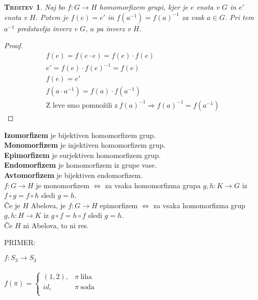 \documentclass[a4paper,12pt]{article}
\newtheorem*{trditev}{\textsc{Trditev}}
\begin{document}
\begin{itemize}
\end{itemize}

\begin{trditev}
Naj bo $f:G\rightarrow H$ homomorfizem grupi, kjer je $e$ enota v $G$ in $e'$ enota v $H$. Potem je $f(e)=e'$ in $f(a^{-1})=f(a)^{-1}$ za vsak $a \in G$. Pri tem $a^{-1}$ predstavlja inverz v $G$, $a$ pa inverz v $H$.\\
\end{trditev}

\begin{proof}
~
\begin{gather*}
f(e)=f(e\cdot e)=f(e)\cdot f(e) \\
e'=f(e)\cdot f(e)^{-1} =f(e)\\
f(e)=e' \\
f(a\cdot a^{-1})=f(a)\cdot f(a^{-1}) \\
\text{Z leve smo pomnožili z}~f(a)^{-1} \Rightarrow f(a)^{-1}=f(a^{-1})
\end{gather*}
\end{proof}

\noindent \textbf{Izomorfizem} je bijektiven homomorfizem grup.\\
\textbf{Monomorfizem} je injektiven homomorfizem grup.\\
\textbf{Epimorfizem} je surjektiven homomorfizem grup.\\
\textbf{Endomorfizem} je homomorfizem iz grupe vase.\\
\textbf{Avtomorfizem} je bijektiven endomorfizem.\\

\noindent $f:G\rightarrow H$ je monomorfizem $\Leftrightarrow$ za vsaka homomorfizma grupa $g,h:K\rightarrow G$ iz $f\circ g=f\circ h$ sledi $g=h$. \\

\noindent Če je $H$ Abelova, je $f:G\rightarrow H$ epimorfizem $\Leftrightarrow$ za vsaka homomorfizma grup $g,h:H\to K$ iz $g\circ f=h\circ f$ sledi $g=h$.\\

\noindent Če $H$ ni Abelova, to ni res.\\

\newpage 

\noindent PRIMER:
\begin{center}
$f:S_3\to S_3$ \\
~\\
$f(\pi)=
\begin{cases}
(1,2),& \pi~\text{liha} \\
id,& \pi~\text{soda}\\
\end{cases}$
\end{center}
\end{document}
